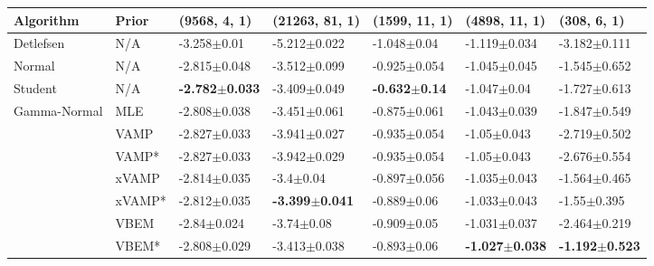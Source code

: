 \begin{tabular}{lllllll}
Algorithm & Prior& (9568, 4, 1)& (21263, 81, 1)& (1599, 11, 1)& (4898, 11, 1)& (308, 6, 1)\\
\midrule
Detlefsen & N/A &            -3.258$\pm$0.01 &           -5.212$\pm$0.022 &           -1.048$\pm$0.04 &           -1.119$\pm$0.034 &           -3.182$\pm$0.111 \\
Normal & N/A &           -2.815$\pm$0.048 &           -3.512$\pm$0.099 &          -0.925$\pm$0.054 &           -1.045$\pm$0.045 &           -1.545$\pm$0.652 \\
Student & N/A &  \textbf{-2.782$\pm$0.033} &           -3.409$\pm$0.049 &  \textbf{-0.632$\pm$0.14} &            -1.047$\pm$0.04 &           -1.727$\pm$0.613 \\
Gamma-Normal & MLE &           -2.808$\pm$0.038 &           -3.451$\pm$0.061 &          -0.875$\pm$0.061 &           -1.043$\pm$0.039 &           -1.847$\pm$0.549 \\
             & VAMP &           -2.827$\pm$0.033 &           -3.941$\pm$0.027 &          -0.935$\pm$0.054 &            -1.05$\pm$0.043 &           -2.719$\pm$0.502 \\
             & VAMP* &           -2.827$\pm$0.033 &           -3.942$\pm$0.029 &          -0.935$\pm$0.054 &            -1.05$\pm$0.043 &           -2.676$\pm$0.554 \\
             & xVAMP &           -2.814$\pm$0.035 &              -3.4$\pm$0.04 &          -0.897$\pm$0.056 &           -1.035$\pm$0.043 &           -1.564$\pm$0.465 \\
             & xVAMP* &           -2.812$\pm$0.035 &  \textbf{-3.399$\pm$0.041} &           -0.889$\pm$0.06 &           -1.033$\pm$0.043 &            -1.55$\pm$0.395 \\
             & VBEM &            -2.84$\pm$0.024 &             -3.74$\pm$0.08 &           -0.909$\pm$0.05 &           -1.031$\pm$0.037 &           -2.464$\pm$0.219 \\
             & VBEM* &           -2.808$\pm$0.029 &           -3.413$\pm$0.038 &           -0.893$\pm$0.06 &  \textbf{-1.027$\pm$0.038} &  \textbf{-1.192$\pm$0.523} \\
\bottomrule
\end{tabular}

